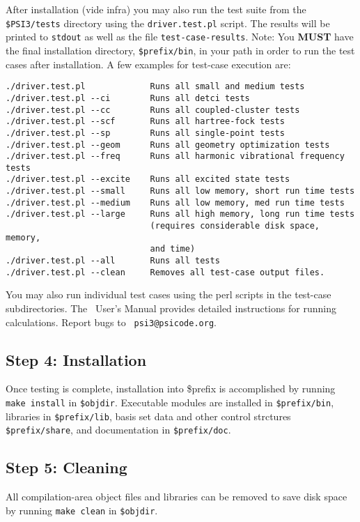 \documentclass[12pt]{article}
\begin{document}
After installation (vide infra) you may also run the test suite from the {\tt
\$PSI3/tests} directory using the {\tt driver.test.pl} script.  The results
will be printed to {\tt stdout} as well as the file {\tt test-case-results}.
Note: You {\bf MUST} have the final installation directory, {\tt \$prefix/bin},
in your path in order to run the test cases after installation.  A few
examples for test-case execution are:
\noindent 
\begin{verbatim}
./driver.test.pl             Runs all small and medium tests
./driver.test.pl --ci        Runs all detci tests
./driver.test.pl --cc        Runs all coupled-cluster tests
./driver.test.pl --scf       Runs all hartree-fock tests
./driver.test.pl --sp        Runs all single-point tests
./driver.test.pl --geom      Runs all geometry optimization tests
./driver.test.pl --freq      Runs all harmonic vibrational frequency tests
./driver.test.pl --excite    Runs all excited state tests
./driver.test.pl --small     Runs all low memory, short run time tests
./driver.test.pl --medium    Runs all low memory, med run time tests
./driver.test.pl --large     Runs all high memory, long run time tests
                             (requires considerable disk space, memory, 
                             and time)
./driver.test.pl --all       Runs all tests
./driver.test.pl --clean     Removes all test-case output files.
\end{verbatim} 

You may also run individual test cases using the perl scripts in
the test-case subdirectories.  The \PSIthree\ User's Manual provides
detailed instructions for running calculations. Report bugs to {\tt
psi3@psicode.org}.

\subsection{Step 4: Installation}

Once testing is complete, installation into \$prefix is accomplished by
running {\tt make install} in {\tt \$objdir}.   Executable modules are
installed in {\tt \$prefix/bin}, libraries in {\tt \$prefix/lib}, basis set
data and other control strctures {\tt \$prefix/share}, and documentation
in {\tt \$prefix/doc}.

\subsection{Step 5: Cleaning}

All compilation-area object files and libraries can be removed to save
disk space by running {\tt make clean} in {\tt \$objdir}.
\end{document}
